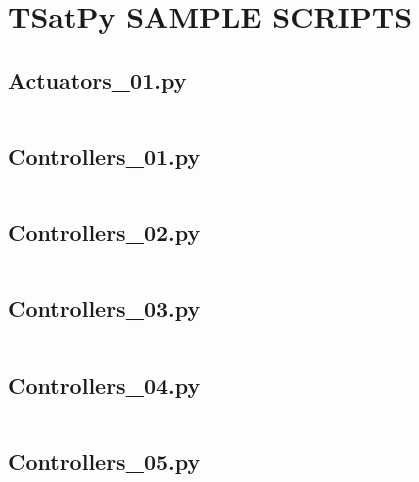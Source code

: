 
\chapter{TSatPy SAMPLE SCRIPTS}
\label{chap:tsatpy_samples}

\linespread{1}

\pagebreak
\section*{Actuators\_01.py}\label{code:TSatPySamples/Actuators_01.py}\inputminted[linenos,fontsize=\scriptsize]{python}{/home/dcouture/git/mathyourlife/TSatPy/tex/sample_scripts/Actuators_01.py}

\pagebreak
\section*{Controllers\_01.py}\label{code:TSatPySamples/Controllers_01.py}\inputminted[linenos,fontsize=\scriptsize]{python}{/home/dcouture/git/mathyourlife/TSatPy/tex/sample_scripts/Controllers_01.py}

\pagebreak
\section*{Controllers\_02.py}\label{code:TSatPySamples/Controllers_02.py}\inputminted[linenos,fontsize=\scriptsize]{python}{/home/dcouture/git/mathyourlife/TSatPy/tex/sample_scripts/Controllers_02.py}

\pagebreak
\section*{Controllers\_03.py}\label{code:TSatPySamples/Controllers_03.py}\inputminted[linenos,fontsize=\scriptsize]{python}{/home/dcouture/git/mathyourlife/TSatPy/tex/sample_scripts/Controllers_03.py}

\pagebreak
\section*{Controllers\_04.py}\label{code:TSatPySamples/Controllers_04.py}\inputminted[linenos,fontsize=\scriptsize]{python}{/home/dcouture/git/mathyourlife/TSatPy/tex/sample_scripts/Controllers_04.py}

\pagebreak
\section*{Controllers\_05.py}\label{code:TSatPySamples/Controllers_05.py}\inputminted[linenos,fontsize=\scriptsize]{python}{/home/dcouture/git/mathyourlife/TSatPy/tex/sample_scripts/Controllers_05.py}

